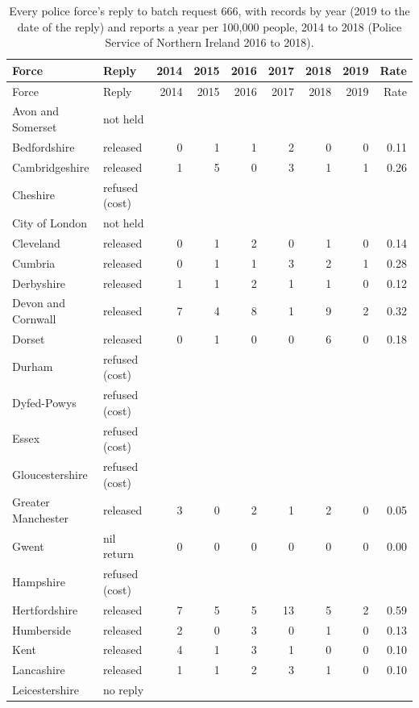 \documentclass[11pt,a4paper]{article}
\begin{document}
{\scriptsize\begin{longtable}{p{3.6cm}p{2.3cm}rrrrrrr}\caption{Every police force's reply to batch request 666, with records by year (2019 to the date of the reply) and reports a year per 100,000 people, 2014 to 2018 (Police Service of Northern Ireland 2016 to 2018).}\label{tab:cats}\\\toprule Force & Reply & 2014 & 2015 & 2016 & 2017 & 2018 & 2019 & Rate\\\midrule\endfirsthead
\toprule Force & Reply & 2014 & 2015 & 2016 & 2017 & 2018 & 2019 & Rate\\\midrule\endhead
Avon and Somerset & not held &  &  &  &  &  &  & \\
Bedfordshire & released & 0 & 1 & 1 & 2 & 0 & 0 & 0.11\\
Cambridgeshire & released & 1 & 5 & 0 & 3 & 1 & 1 & 0.26\\
Cheshire & refused (cost) &  &  &  &  &  &  & \\
City of London & not held &  &  &  &  &  &  & \\
Cleveland & released & 0 & 1 & 2 & 0 & 1 & 0 & 0.14\\
Cumbria & released & 0 & 1 & 1 & 3 & 2 & 1 & 0.28\\
Derbyshire & released & 1 & 1 & 2 & 1 & 1 & 0 & 0.12\\
Devon and Cornwall & released & 7 & 4 & 8 & 1 & 9 & 2 & 0.32\\
Dorset & released & 0 & 1 & 0 & 0 & 6 & 0 & 0.18\\
Durham & refused (cost) &  &  &  &  &  &  & \\
Dyfed-Powys & refused (cost) &  &  &  &  &  &  & \\
Essex & refused (cost) &  &  &  &  &  &  & \\
Gloucestershire & refused (cost) &  &  &  &  &  &  & \\
Greater Manchester & released & 3 & 0 & 2 & 1 & 2 & 0 & 0.05\\
Gwent & nil return & 0 & 0 & 0 & 0 & 0 & 0 & 0.00\\
Hampshire & refused (cost) &  &  &  &  &  &  & \\
Hertfordshire & released & 7 & 5 & 5 & 13 & 5 & 2 & 0.59\\
Humberside & released & 2 & 0 & 3 & 0 & 1 & 0 & 0.13\\
Kent & released & 4 & 1 & 3 & 1 & 0 & 0 & 0.10\\
Lancashire & released & 1 & 1 & 2 & 3 & 1 & 0 & 0.10\\
Leicestershire & no reply &  &  &  &  &  &  & \\

\end{longtable}}
\end{document}
